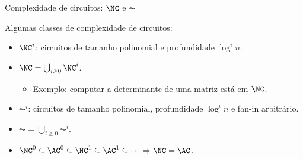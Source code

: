 \documentclass[landscape, 9pt]{beamer}
\begin{document}
\begin{frame} {Complexidade de circuitos: $\NC$ e $\AC$}

Algumas classes de complexidade de circuitos:

\begin{itemize}

	\item $\NC^{i}$: circuitos de tamanho polinomial e profundidade $\log^{i} n$.
	
	\item $\NC = \bigcup_{i \geq 0} \NC^{i}$.
	
	\begin{itemize}
	
		\item Exemplo: computar a determinante de uma matriz está em $\NC$.
	
	\end{itemize}
	
	\item $\AC^{i}$: circuitos de tamanho polinomial, profundidade $\log^{i} n$ e fan-in arbitrário.
	
	\item $\AC = \bigcup_{i \geq 0} \AC^{i}$.
	
	\item $\NC^{0} \subseteq \AC^{0} \subseteq \NC^{1} \subseteq \AC^{1} \subseteq \dots \Rightarrow \NC = \AC$.

\end{itemize}

\end{frame}

\end{document}
